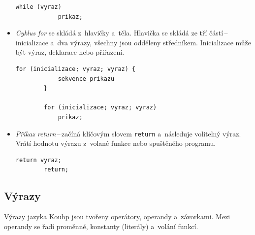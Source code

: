 \begin{itemize}
\begin{lstlisting}[language=Koubp]
        while (vyraz)
            prikaz;
    \end{lstlisting}
    \item \emph{Cyklus for} se skládá z~hlavičky a~těla.
    Hlavička se skládá ze tří částí\,--\,inicializace a~dva výrazy, všechny jsou odděleny středníkem.
    Inicializace může být výraz, deklarace nebo přiřazení.
    \begin{lstlisting}[language=Koubp]
        for (inicializace; vyraz; vyraz) {
            sekvence_prikazu
        }

        for (inicializace; vyraz; vyraz) 
            prikaz;
    \end{lstlisting}
    \item \emph{Příkaz return}\,--\,začíná klíčovým slovem \texttt{return} a~následuje volitelný výraz.
    Vrátí hodnotu výrazu z~volané funkce nebo spuštěného programu.
    \begin{lstlisting}[language=Koubp]
        return vyraz;
        return;
    \end{lstlisting}
\end{itemize}

\subsection*{Výrazy}
Výrazy jazyka Koubp jsou tvořeny operátory, operandy a~závorkami.
Mezi operandy se řadí proměnné, konstanty (literály) a~volání funkcí.

